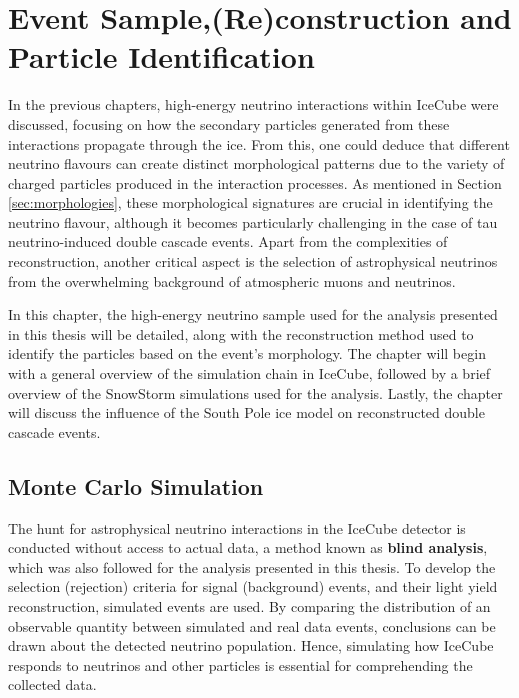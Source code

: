 \setchapterpreamble[u]{\margintoc}
\chapter{Event Sample,(Re)construction and Particle Identification}
In the previous chapters, high-energy neutrino interactions within IceCube were discussed, focusing on how the secondary particles generated from these interactions propagate through the ice. From this, one could deduce that different neutrino flavours can create distinct morphological patterns due to the variety of charged particles produced in the interaction processes. As mentioned in Section \ref{sec:morphologies}, these morphological signatures are crucial in identifying the neutrino flavour, although it becomes particularly challenging in the case of tau neutrino-induced double cascade events. Apart from the complexities of reconstruction, another critical aspect is the selection of astrophysical neutrinos from the overwhelming background of atmospheric muons and neutrinos.

In this chapter, the high-energy neutrino sample used for the analysis presented in this thesis will be detailed, along with the reconstruction method used to identify the particles based on the event's morphology. The chapter will begin with a general overview of the simulation chain in IceCube, followed by a brief overview of the SnowStorm simulations used for the analysis. Lastly, the chapter will discuss the influence of the South Pole ice model on reconstructed double cascade events.

\section{Monte Carlo Simulation} 
\label{sec:mc_sim}
The hunt for astrophysical neutrino interactions in the IceCube detector is conducted without access to actual data, a method known as \textbf{blind analysis}, which was also followed for the analysis presented in this thesis. To develop the selection (rejection) criteria for signal (background) events, and their light yield reconstruction, simulated events are used. By comparing the distribution of an observable quantity between simulated and real data events, conclusions can be drawn about the detected neutrino population. Hence, simulating how IceCube responds to neutrinos and other particles is essential for comprehending the collected data. 

